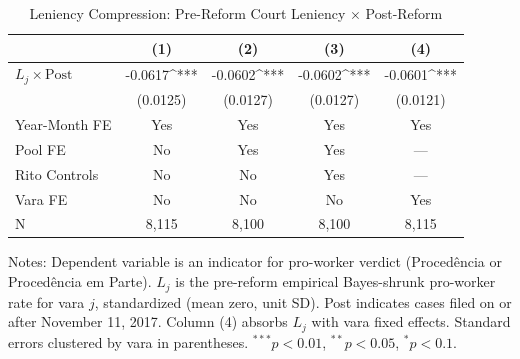 \begin{table}[t]
\centering
\caption{Leniency Compression: Pre-Reform Court Leniency $\times$ Post-Reform}
\label{tab:main}
\begin{tabular}{lcccc}
\hline\hline
 & (1) & (2) & (3) & (4) \\
\hline
$L_j \times \text{Post}$ & -0.0617^{***} & -0.0602^{***} & -0.0602^{***} & -0.0601^{***} \\
 & (0.0125) & (0.0127) & (0.0127) & (0.0121) \\
\hline
Year-Month FE & Yes & Yes & Yes & Yes \\
Pool FE & No & Yes & Yes & --- \\
Rito Controls & No & No & Yes & --- \\
Vara FE & No & No & No & Yes \\
N & 8,115 & 8,100 & 8,100 & 8,115 \\
\hline\hline
\end{tabular}
\begin{flushleft}\small
Notes: Dependent variable is an indicator for pro-worker verdict (Proced\^{e}ncia or Proced\^{e}ncia em Parte). $L_j$ is the pre-reform empirical Bayes-shrunk pro-worker rate for vara $j$, standardized (mean zero, unit SD). Post indicates cases filed on or after November 11, 2017. Column (4) absorbs $L_j$ with vara fixed effects. Standard errors clustered by vara in parentheses. $^{***}p<0.01$, $^{**}p<0.05$, $^{*}p<0.1$.
\end{flushleft}
\end{table}
